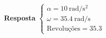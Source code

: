 \textbf{Resposta}
$
\begin{cases}
	\alpha=\SI{10}{\radian/\second^{2}}\\
	\omega=\SI{35.4}{\radian/\second}\\
	\textrm{Revoluções}=35.3
\end{cases}
$